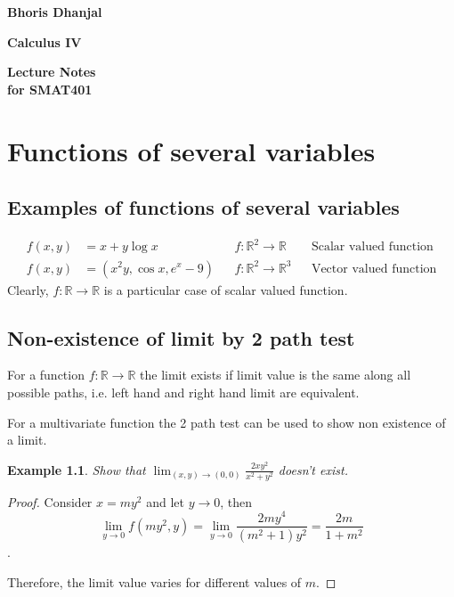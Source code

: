 \documentclass[oneside,11pt,pdftex]{book}%
\numberwithin{equation}{section}
\newtheorem{example}[theorem]{Example}
\numberwithin{section}{chapter}
\numberwithin{equation}{chapter}
\newcommand{\R}{\mathbb{R}}
\begin{document}
\frontmatter

\thispagestyle{empty}
\begin{flushright}
{\LARGE \textbf{Bhoris Dhanjal}}%
\end{flushright}
\vfill
\begin{center}
{\fontsize{29.86truept}{0truept}\selectfont \textbf{Calculus IV}}%
\end{center}
\vfill
\begin{flushleft}
{\LARGE \textbf{Lecture Notes}} \\
\hspace{-1.75truept}
{\large \textbf{for SMAT401}}
\end{flushleft}
\newpage

\tableofcontents


\mainmatter

\chapter{Functions of several variables}
\section{Examples of functions of several variables}
\begin{align*}
	f(x,y)&=x+y \log x && f:\R^2 \rightarrow \R && \text{Scalar valued function}\\
	f(x,y)&=(x^2y, \cos x, e^x-9) && f:\R^2 \rightarrow \R^3 && \text{Vector valued function}
\end{align*}
Clearly, $ f: \R \rightarrow \R $ is a particular case of scalar valued function.\\

\section{Non-existence of limit by 2 path test}
For a function $ f: \R \rightarrow \R $ the limit exists if limit value is the same along all possible paths, i.e. left hand and right hand limit are equivalent.\par
For a multivariate function the 2 path test can be used to show non existence of a limit.
\begin{example}
	Show that $ \lim_{(x,y)\rightarrow (0,0)}\frac{2xy^2}{x^2+y^2} $ doesn't exist.
\end{example}
\begin{proof}
	Consider $ x=my^2 $ and let $ y\rightarrow 0 $, then \[ \lim_{y\rightarrow0} f(my^2,y)=\lim_{y \rightarrow 0} \frac{2my^4}{(m^2+1)y^2}=\frac{2m}{1+m^2} \]. \par 
	Therefore, the limit value varies for different values of $ m $.
\end{proof}
\end{document}
